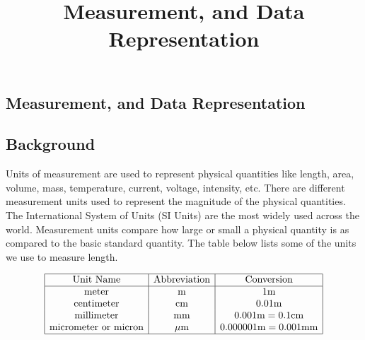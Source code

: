 \documentclass{ximera}
\author{}
\title{Measurement, and Data Representation} \license{CC BY-NC-SA 4.0}
\begin{document}
\begin{abstract}
\end{abstract}
\maketitle

\begin{onlineOnly}
\section*{Measurement, and Data Representation}
\end{onlineOnly}
\subsection*{Background}
Units of measurement are used to represent physical quantities like length, area, volume, mass, temperature, current, voltage, intensity, etc.  There are different measurement units used to represent the magnitude of the physical quantities. The International System of Units (SI Units) are the most widely used across the world. Measurement units compare how large or small a physical quantity is as compared to the basic standard quantity.  The table below lists some of the units we use to measure length. 

$$\begin{array}{|c|c|c|} 
 \hline \text{Unit Name}&\text{Abbreviation}&\text{Conversion}\\ \hline 
 \text{meter}&\text{m}&1\text{m}\\
 \text{centimeter} &\text{cm}&0.01\text{m}\\
 \text{millimeter} &\text{mm}&0.001\text{m}=0.1\text{cm}\\
 \text{micrometer or micron} &\mu\text{m}&0.000001\text{m}=0.001\text{mm}\\
  \hline 
 \end{array}$$

\end{document}
